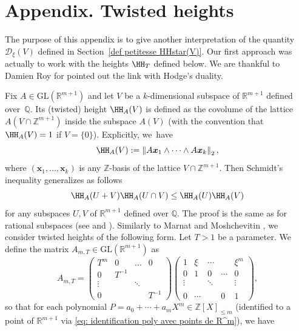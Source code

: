 \documentclass[JEP,XML,SOM,Unicode,NoFloatCountersInSection,published]{cedram}
\newcommand\bx{\boldsymbol{x}}
\newcommand\bQ{\mathbb{Q}}
\newcommand\bR{\mathbb{R}}
\newcommand\bZ{\mathbb{Z}}
\newcommand\GL{\mathrm{GL}}
\newcommand\HHstar{\mathcal{D}_{\xi}}
\newcommand{\norm}[1]{\left\|#1 \right\|_2}
\theoremstyle{definition}
\theoremstyle{plain}
\begin{document}
\appendix

\section*{Appendix. Twisted heights}

The purpose of this appendix is to give another interpretation of the quantity $\HHstar(V)$ defined in Section~\ref{def petitesse HHstar(V)}. Our first approach was actually to work with the heights $\HH_T$ defined below. We are thankful to Damien Roy for pointed out the link with Hodge's duality.

Fix $A\in \GL(\bR^{m+1})$ and let $V$ be a $k$-dimensional subspace of $\bR^{m+1}$ defined over~$\bQ$. Its (twisted) height $\HH_A(V)$ is defined as
the covolume of the lattice $A(V\cap\bZ^{m+1})$ inside the subspace $A(V)$ (with the convention that $\HH_A(V) = 1$ if $V=\{0\}$). Explicitly, we~have
\begin{equation}
\label{eq: def hauteur tordue}
\HH_A(V) := \norm{A\bx_1\wedge \cdots \wedge A\bx_k },
\end{equation}
where $(\bx_1,\dots,\bx_k)$ is any $\bZ$-basis of the lattice $V\cap \bZ^{m+1}$. Then Schmidt's inequality generalizes as follows
\begin{equation}
\label{eq : inegalite de Schmidt}
\HH_A(U+V) \HH_A(U\cap V) \leq \HH_A(U) \HH_A(V)
\end{equation}
for any subspaces $U,V$ of $\bR^{m+1}$ defined over $\bQ$. The proof is the same as for rational subspaces (see \cite[Ch.\,I, Lem.\, 8A]{Schmidt} and \cite[\S 5]{marnat2018optimal}). Similarly to Marnat and Moshchevitin \cite[\S 5]{marnat2018optimal}, we consider twisted heights of the following form. Let $T>1$ be a parameter. We define the matrix $A_{m,T}\in\GL(\bR^{m+1})$ as
\[
A_{m,T} = \begin{pmatrix}
T^{m} & 0 & \dots & 0 \\
0 & T^{-1} & & \\
\vdots & & \ddots & \\
0 & & & T^{-1}
\end{pmatrix}
\begin{pmatrix}
1 & \xi & \cdots & & \xi^{m} \\
0 & 1 & 0 & \cdots & 0 \\
\vdots & & \ddots & & \vdots \\
& & & & \\
0 & \cdots & & 0 & 1
\end{pmatrix},
\]
so that for each polynomial $P= a_0+\cdots + a_{m}X^{m} \in \bZ[X]_{\leq m}$ (identified to a point of $\bR^{m+1}$ via \eqref{eq: identification poly avec points de R^m}), we have
\end{document}
